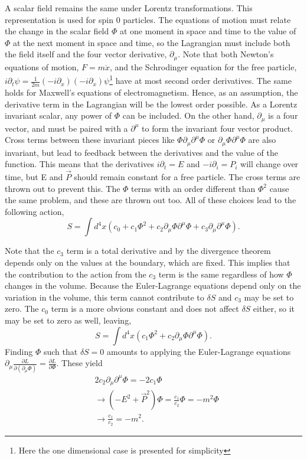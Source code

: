 A scalar field remains the same under Lorentz transformations. This representation is used for spin 0 particles. The equations of motion must relate the change in the scalar field $\Phi$ at one moment in space and time to the value of $\Phi$ at the next moment in space and time, so the Lagrangian must include both the field itself and the four vector derivative, $\partial_\mu$. Note that both Newton's equations of motion, $F=m\ddot{x}$, and the Schrodinger equation for the free particle, $i\partial_t\psi = \frac{1}{2m}(-i\partial_x)(-i\partial_x)\psi$\footnote{Here the one dimensional case is presented for simplicity} have at most second order derivatives. The same holds for Maxwell's equations of electromagnetism. Hence, as an assumption, the derivative term in the Lagrangian will be the lowest order possible. As a Lorentz invariant scalar, any power of $\Phi$ can be included. On the other hand, $\partial_\mu$ is a four vector, and must be paired with a $\partial^\mu$ to form the invariant four vector product. Cross terms between these invariant pieces like $\Phi\partial_\mu\partial^\mu\Phi$ or $\partial_\mu\Phi\partial^\mu\Phi$ are also invariant, but lead to feedback between the derivatives and the value of the function. This means that the derivatives $i\partial_t = E$ and $-i\partial_i = P_i$ will change over time, but E and $\vec{P}$ should remain constant for a free particle. The cross terms are thrown out to prevent this. The $\Phi$ terms with an order different than $\Phi^2$ cause the same problem, and these are thrown out too. All of these choices lead to the following action, 
\begin{equation}
S = \int d^4x \left(c_0 + c_1 \Phi^2  
+ c_2 \partial_\mu\Phi\partial^\mu\Phi + c_3 \partial_\mu \partial^\mu \Phi\right).
\end{equation}

Note that the $c_3$ term is a total derivative and by the divergence theorem depends only on the values at the boundary, which are fixed. This implies that the contribution to the action from the $c_3$ term is the same regardless of how $\Phi$ changes in the volume. Because the Euler-Lagrange equations depend only on the variation in the volume, this term cannot contribute to $\delta S$ and $c_3$ may be set to zero. The $c_0$ term is a more obvious constant and does not affect $\delta S$ either, so it may be set to zero as well, leaving,  
\begin{equation}
S = \int d^4x \left(c_1 \Phi^2 + c_2 \partial_\mu\Phi\partial^\mu\Phi\right).
\end{equation}
Finding $\Phi$ such that $\delta S = 0$ amounts to applying the Euler-Lagrange equations $\partial_\mu \frac{\partial L}{\partial\left(\partial_\mu\Phi\right)} = \frac{\partial L}{\partial \Phi}$. These yield 
\begin{equation}
\begin{split}
&2c_2\partial_\mu\partial^\mu\Phi = -2c_1\Phi \\ 
&\rightarrow (-E^2 + \vec{P}^2)\Phi = \frac{c_1}{c_2}\Phi = -m^2\Phi \\
&\rightarrow \frac{c_1}{c_2} = -m^2.
\end{split}
\end{equation}

